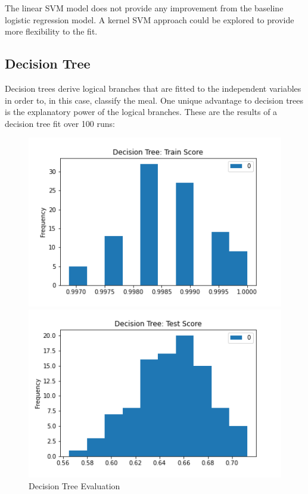 \documentclass{article}
\begin{document}
The linear SVM model does not provide any improvement from the baseline logistic regression model. A kernel SVM approach could be explored to provide more flexibility to the fit.

\subsection{Decision Tree}
\label{ssec:subhead}

Decision trees derive logical branches that are fitted to the independent variables in order to, in this case, classify the meal. One unique advantage to decision trees is the explanatory power of the logical branches. These are the results of a decision tree fit over 100 runs:\\

\begin{figure}[htb]
\begin{minipage}[b]{.48\linewidth}
  \centering
  \centerline{\includegraphics[scale=0.3]{Tree_Train_Score.png}}
\end{minipage}
\hfill
\begin{minipage}[b]{0.48\linewidth}
  \centering
  \centerline{\includegraphics[scale=0.3]{Tree_Test_Score.png}}
\end{minipage}
\caption{Decision Tree Evaluation}
\label{fig:res}
\end{figure}
\end{document}
